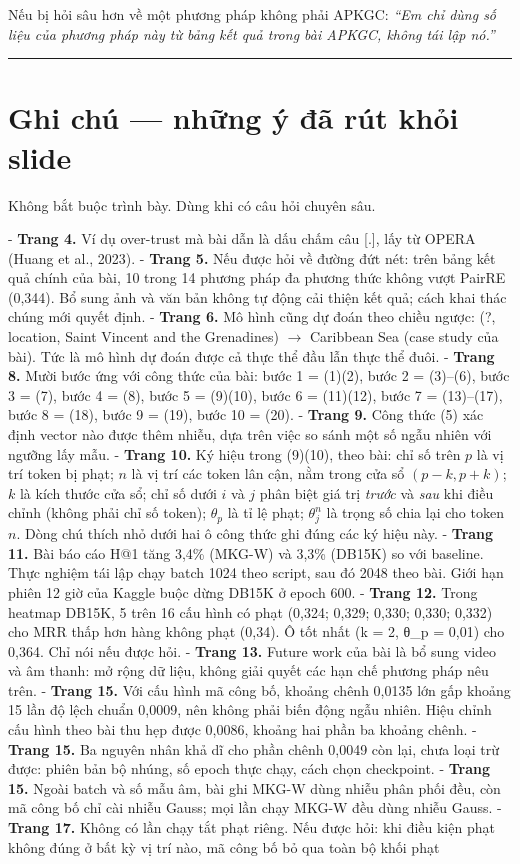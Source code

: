 \documentclass[11pt,a4paper]{article}
\newcommand{\code}[1]{{\ttfamily\small\color{codetext}#1}}
\begin{document}
Nếu bị hỏi sâu hơn về một phương pháp không phải APKGC: \emph{``Em chỉ dùng số liệu của phương pháp này từ bảng kết quả trong bài APKGC, không tái lập nó.''}


\medskip\noindent\rule{\linewidth}{0.3pt}\medskip

\newpage
\section*{Ghi chú --- những ý đã rút khỏi slide}

Không bắt buộc trình bày. Dùng khi có câu hỏi chuyên sâu.


- \textbf{Trang 4.} Ví dụ over-trust mà bài dẫn là dấu chấm câu \code{[.]}, lấy từ OPERA (Huang et al., 2023). - \textbf{Trang 5.} Nếu được hỏi về đường đứt nét: trên bảng kết quả chính của bài, 10 trong 14 phương pháp đa phương thức không vượt PairRE (0,344). Bổ sung ảnh và văn bản không tự động cải thiện kết quả; cách khai thác chúng mới quyết định. - \textbf{Trang 6.} Mô hình cũng dự đoán theo chiều ngược: (?, location, Saint Vincent and the Grenadines) $\to$ Caribbean Sea (case study của bài). Tức là mô hình dự đoán được cả thực thể đầu lẫn thực thể đuôi. - \textbf{Trang 8.} Mười bước ứng với công thức của bài: bước 1 = (1)(2), bước 2 = (3)--(6), bước 3 = (7), bước 4 = (8), bước 5 = (9)(10), bước 6 = (11)(12), bước 7 = (13)--(17), bước 8 = (18), bước 9 = (19), bước 10 = (20). - \textbf{Trang 9.} Công thức (5) xác định vector nào được thêm nhiễu, dựa trên việc so sánh một số ngẫu nhiên với ngưỡng lấy mẫu. - \textbf{Trang 10.} Ký hiệu trong (9)(10), theo bài: chỉ số trên $p$ là vị trí token bị phạt; $n$ là vị trí các token lân cận, nằm trong cửa sổ $(p-k, p+k)$; $k$ là kích thước cửa sổ; chỉ số dưới $i$ và $j$ phân biệt giá trị \emph{trước} và \emph{sau} khi điều chỉnh (không phải chỉ số token); $\theta_p$ là tỉ lệ phạt; $\theta^n_j$ là trọng số chia lại cho token $n$. Dòng chú thích nhỏ dưới hai ô công thức ghi đúng các ký hiệu này. - \textbf{Trang 11.} Bài báo cáo H@1 tăng 3,4\% (MKG-W) và 3,3\% (DB15K) so với baseline. Thực nghiệm tái lập chạy batch 1024 theo script, sau đó 2048 theo bài. Giới hạn phiên 12 giờ của Kaggle buộc dừng DB15K ở epoch 600. - \textbf{Trang 12.} Trong heatmap DB15K, 5 trên 16 cấu hình có phạt (0,324; 0,329; 0,330; 0,330; 0,332) cho MRR thấp hơn hàng không phạt (0,34). Ô tốt nhất (k = 2, θ\_p = 0,01) cho 0,364. Chỉ nói nếu được hỏi. - \textbf{Trang 13.} Future work của bài là bổ sung video và âm thanh: mở rộng dữ liệu, không giải quyết các hạn chế phương pháp nêu trên. - \textbf{Trang 15.} Với cấu hình mã công bố, khoảng chênh 0,0135 lớn gấp khoảng 15 lần độ lệch chuẩn 0,0009, nên không phải biến động ngẫu nhiên. Hiệu chỉnh cấu hình theo bài thu hẹp được 0,0086, khoảng hai phần ba khoảng chênh. - \textbf{Trang 15.} Ba nguyên nhân khả dĩ cho phần chênh 0,0049 còn lại, chưa loại trừ được: phiên bản bộ nhúng, số epoch thực chạy, cách chọn checkpoint. - \textbf{Trang 15.} Ngoài batch và số mẫu âm, bài ghi MKG-W dùng nhiễu phân phối đều, còn mã công bố chỉ cài nhiễu Gauss; mọi lần chạy MKG-W đều dùng nhiễu Gauss. - \textbf{Trang 17.} Không có lần chạy tắt phạt riêng. Nếu được hỏi: khi điều kiện phạt không đúng ở bất kỳ vị trí nào, mã công bố bỏ qua toàn bộ khối phạt 
\end{document}
